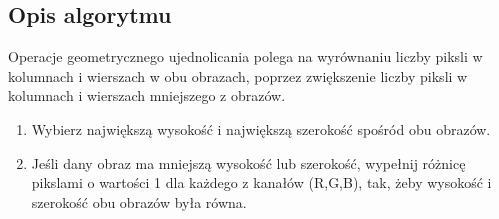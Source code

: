 \documentclass[a4paper,12pt, titlepage]{report}
\begin{document}
\subsection*{Opis algorytmu}
\par Operacje geometrycznego ujednolicania polega na wyrównaniu liczby piksli w kolumnach i wierszach w obu obrazach, poprzez zwiększenie liczby piksli w kolumnach i wierszach mniejszego z obrazów.
\begin{enumerate}
\item Wybierz największą wysokość i największą szerokość spośród obu obrazów.
\item Jeśli dany obraz ma mniejszą wysokość lub szerokość, wypełnij różnicę pikslami o wartości 1 dla każdego z kanałów (R,G,B), tak, żeby wysokość i szerokość obu obrazów była równa.
\end{enumerate}
\end{document}
